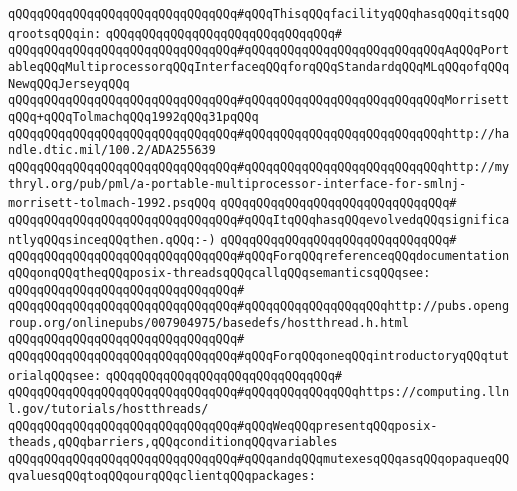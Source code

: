 \verb|qQQqqQQqqQQqqQQqqQQqqQQqqQQqqQQq#qQQqThisqQQqfacilityqQQqhasqQQqitsqQQqrootsqQQqin:|\newline
\verb|qQQqqQQqqQQqqQQqqQQqqQQqqQQqqQQq#|\newline
\verb|qQQqqQQqqQQqqQQqqQQqqQQqqQQqqQQq#qQQqqQQqqQQqqQQqqQQqqQQqqQQqAqQQqPortableqQQqMultiprocessorqQQqInterfaceqQQqforqQQqStandardqQQqMLqQQqofqQQqNewqQQqJerseyqQQq|\newline
\verb|qQQqqQQqqQQqqQQqqQQqqQQqqQQqqQQq#qQQqqQQqqQQqqQQqqQQqqQQqqQQqMorrisettqQQq+qQQqTolmachqQQq1992qQQq31pqQQq|\newline
\verb|qQQqqQQqqQQqqQQqqQQqqQQqqQQqqQQq#qQQqqQQqqQQqqQQqqQQqqQQqqQQqhttp://handle.dtic.mil/100.2/ADA255639|\newline
\verb|qQQqqQQqqQQqqQQqqQQqqQQqqQQqqQQq#qQQqqQQqqQQqqQQqqQQqqQQqqQQqhttp://mythryl.org/pub/pml/a-portable-multiprocessor-interface-for-smlnj-morrisett-tolmach-1992.psqQQq|\newline
\verb|qQQqqQQqqQQqqQQqqQQqqQQqqQQqqQQq#|\newline
\verb|qQQqqQQqqQQqqQQqqQQqqQQqqQQqqQQq#qQQqItqQQqhasqQQqevolvedqQQqsignificantlyqQQqsinceqQQqthen.qQQq:-)|\newline
\verb|qQQqqQQqqQQqqQQqqQQqqQQqqQQqqQQq#|\newline
\verb|qQQqqQQqqQQqqQQqqQQqqQQqqQQqqQQq#qQQqForqQQqreferenceqQQqdocumentationqQQqonqQQqtheqQQqposix-threadsqQQqcallqQQqsemanticsqQQqsee:|\newline
\verb|qQQqqQQqqQQqqQQqqQQqqQQqqQQqqQQq#|\newline
\verb|qQQqqQQqqQQqqQQqqQQqqQQqqQQqqQQq#qQQqqQQqqQQqqQQqqQQqhttp://pubs.opengroup.org/onlinepubs/007904975/basedefs/hostthread.h.html|\newline
\verb|qQQqqQQqqQQqqQQqqQQqqQQqqQQqqQQq#|\newline
\verb|qQQqqQQqqQQqqQQqqQQqqQQqqQQqqQQq#qQQqForqQQqoneqQQqintroductoryqQQqtutorialqQQqsee:|\newline
\verb|qQQqqQQqqQQqqQQqqQQqqQQqqQQqqQQq#|\newline
\verb|qQQqqQQqqQQqqQQqqQQqqQQqqQQqqQQq#qQQqqQQqqQQqqQQqhttps://computing.llnl.gov/tutorials/hostthreads/|\newline
\newline
\verb|qQQqqQQqqQQqqQQqqQQqqQQqqQQqqQQq#qQQqWeqQQqpresentqQQqposix-theads,qQQqbarriers,qQQqconditionqQQqvariables|\newline
\verb|qQQqqQQqqQQqqQQqqQQqqQQqqQQqqQQq#qQQqandqQQqmutexesqQQqasqQQqopaqueqQQqvaluesqQQqtoqQQqourqQQqclientqQQqpackages:|\newline

